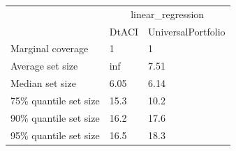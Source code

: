 \begin{tabular}{lll}
\toprule
& \multicolumn{2}{c}{linear_regression} \\
& DtACI & UniversalPortfolio \\
\midrule
Marginal coverage & 1 & 1 \\
Average set size & inf & 7.51 \\
Median set size & 6.05 & 6.14 \\
75\% quantile set size & 15.3 & 10.2 \\
90\% quantile set size & 16.2 & 17.6 \\
95\% quantile set size & 16.5 & 18.3 \\
\bottomrule
\end{tabular}
